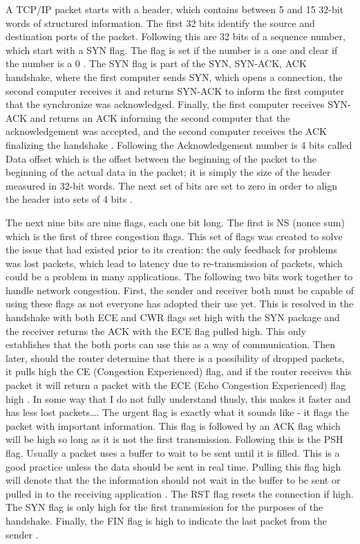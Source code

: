 \documentclass[a4paper]{article}
\begin{document}
	A TCP/IP packet starts with a header, which contains between 5 and 15 32-bit words of structured information.  The first 32 bits identify the source and destination ports of the packet.  Following this are 32 bits of a sequence number, which start with a SYN flag.  The flag is set if the number is a one and clear if the number is a 0 \cite{tcpwiki}.  The SYN flag is part of the SYN, SYN-ACK, ACK handshake, where the first computer sends SYN, which opens a connection, the second computer receives it and returns SYN-ACK to inform the first computer that the synchronize was acknowledged.  Finally, the first computer receives SYN-ACK and returns an ACK informing the second computer that the acknowledgement was accepted, and the second computer receives the ACK finalizing the handshake \cite{inet}.  Following the Acknowledgement number is 4 bits called Data offset which is the offset between the beginning of the packet to the beginning of the actual data in the packet; it is simply the size of the header measured in 32-bit words.  The next set of bits are set to zero in order to align the header into sets of 4 bits \cite{lifetcp}.
    
	The next nine bits are nine flags, each one bit long.  The first is NS (nonce sum) which is the first of three congestion flags.  This set of flags was created to solve the issue that had existed prior to its creation: the only feedback for problems was lost packets, which lead to latency due to re-transmission of packets, which could be a problem in many applications.  The following two bits work together to handle network congestion.  First, the sender and receiver both must be capable of using these flags as not everyone has adopted their use yet.  This is resolved in the handshake with both ECE and CWR flags set high with the SYN package and the receiver returns the ACK with the ECE flag pulled high.  This only establishes that the both ports can use this as a way of communication.  Then later, should the router determine that there is a possibility of dropped packets, it pulls high the CE (Congestion Experienced) flag, and if the router receives this packet it will return a packet with the ECE (Echo Congestion Experienced) flag high \cite{catch}.  In some way that I do not fully understand thusly, this makes it faster and has less lost packets\dots.  The urgent flag is exactly what it sounds like - it flags the packet with important information.  This flag is followed by an ACK flag which will be high so long as it is not the first transmission.  Following this is the PSH flag.  Usually a packet uses a buffer to wait to be sent until it is filled.  This is a good practice unless the data should be sent in real time.  Pulling this flag high will denote that the the information should not wait in the buffer to be sent or pulled in to the receiving application \cite{pktlife}.  The RST flag resets the connection if high.  The SYN flag is only high for the first transmission for the purposes of the handshake.  Finally, the FIN flag is high to indicate the last packet from the sender \cite{tcpwiki}.
    
\end{document}
